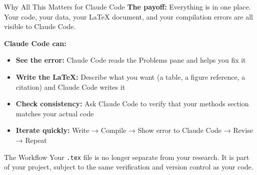 \documentclass[aspectratio=169, 11pt]{beamer}
\begin{document}
\begin{frame}{Why All This Matters for Claude Code}
  \textbf{The payoff:} Everything is in one place. Your code, your data, your \LaTeX{} document, and your compilation errors are all visible to Claude Code.

  \vspace{0.8em}
  \textbf{Claude Code can:}
  \begin{itemize}
    \item \textbf{See the error:} Claude Code reads the Problems pane and helps you fix it
    \item \textbf{Write the \LaTeX:} Describe what you want (a table, a figure reference, a citation) and Claude Code writes it
    \item \textbf{Check consistency:} Ask Claude Code to verify that your methods section matches your actual code
    \item \textbf{Iterate quickly:} Write → Compile → Show error to Claude Code → Revise → Repeat
  \end{itemize}

  \vspace{0.8em}
  \begin{block}{The Workflow}
    Your \texttt{.tex} file is no longer separate from your research. It is part of your project, subject to the same verification and version control as your code.
  \end{block}
\end{frame}
\end{document}
